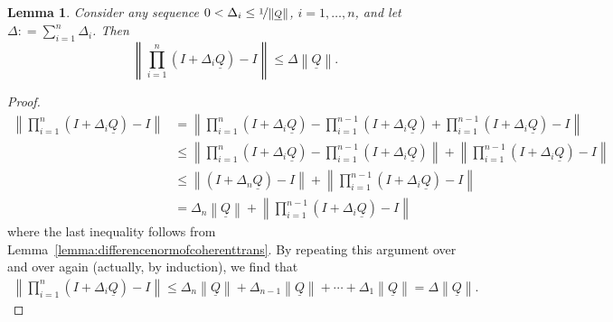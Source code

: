 \documentclass[10pt]{paper}
\newtheorem{lemma}[theorem]{Lemma}
\newcommand{\lrate}{\underline{Q}}
\newcommand{\norm}[1]{\left\lVert #1 \right\rVert}
\newcommand{\coloneqq}{:\!=}
\begin{document}
\begin{lemma}\label{lemma:justtheindicator_appendix}
Consider any sequence $0<\Delta_i\leq\nicefrac{1}{\norm{\lrate}}$, $i=1,\dots,n$, and let $\Delta\coloneqq\sum_{i=1}^n\Delta_i$. Then
\begin{equation*}
\norm{\prod_{i=1}^n(I+\Delta_i\lrate)-I}\leq\Delta\norm{\lrate}.
\end{equation*}
\end{lemma}
\begin{proof}
\begin{align*}
\norm{\prod_{i=1}^n(I+\Delta_i\lrate)-I}
&=\norm{\prod_{i=1}^n(I+\Delta_i\lrate)-\prod_{i=1}^{n-1}(I+\Delta_i\lrate)+\prod_{i=1}^{n-1}(I+\Delta_i\lrate)-I}\\
&\leq\norm{\prod_{i=1}^n(I+\Delta_i\lrate)-\prod_{i=1}^{n-1}(I+\Delta_i\lrate)}+\norm{\prod_{i=1}^{n-1}(I+\Delta_i\lrate)-I}\\
&\leq\norm{(I+\Delta_n\lrate)-I}+\norm{\prod_{i=1}^{n-1}(I+\Delta_i\lrate)-I}\\
&=\Delta_n\norm{\lrate}+\norm{\prod_{i=1}^{n-1}(I+\Delta_i\lrate)-I}
\end{align*}
where the last inequality follows from Lemma~\ref{lemma:differencenormofcoherenttrans}. By repeating this argument over and over again (actually, by induction), we find that
\begin{align*}
\norm{\prod_{i=1}^n(I+\Delta_i\lrate)-I}
\leq \Delta_n\norm{\lrate} +\Delta_{n-1}\norm{\lrate}+\cdots
+\Delta_1\norm{\lrate}
=\Delta\norm{\lrate}.
\end{align*}
\end{proof}
\end{document}
